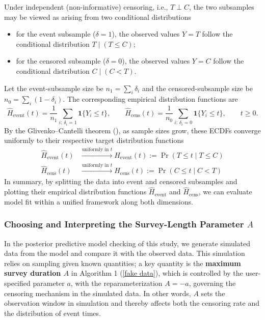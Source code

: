 Under independent (non-informative) censoring, i.e., $T\perp C$, the two subsamples may be viewed as arising from two conditional distributions
\begin{itemize}
    \item for the event subsample ($\delta=1$), the observed values $Y=T$ follow the conditional distribution $T\mid(T\le C)$;
    \item for the censored subsample ($\delta=0$), the observed values $Y=C$ follow the conditional distribution $C\mid(C<T)$.
\end{itemize}
Let the event-subsample size be $n_1=\sum_i \delta_i$ and the censored-subsample size be $n_0=\sum_i (1-\delta_i)$. The corresponding empirical distribution functions are
\begin{equation}
    \widehat H_{\text{event}}(t)
=\frac{1}{n_1}\sum_{i:\,\delta_i=1}\mathbf 1\{Y_i\le t\},\qquad
\widehat H_{\text{cens}}(t)
=\frac{1}{n_0}\sum_{i:\,\delta_i=0}\mathbf 1\{Y_i\le t\},\qquad t\ge 0.
\end{equation}
By the Glivenko–Cantelli theorem (\cite{tucker1959generalization}), as sample sizes grow, these ECDFs converge uniformly to their respective target distribution functions
\begin{align}
\widehat H_{\text{event}}(t) &\xrightarrow{\text{uniformly in } t} H_{\text{event}}(t) := \Pr(T \le t \mid T \le C) \\
\widehat H_{\text{cens}}(t) &\xrightarrow{\text{uniformly in } t} H_{\text{cens}}(t) := \Pr(C \le t \mid C < T)
\end{align}
In summary, by splitting the data into event and censored subsamples and plotting their empirical distribution functions $\widehat H_{\text{event}}$ and $\widehat H_{\text{cens}}$, we can evaluate model fit within a unified framework along both dimensions.



\subsubsection{Choosing and Interpreting the Survey-Length Parameter $A$}

In the posterior predictive model checking of this study, we generate simulated data from the model and compare it with the observed data. This simulation relies on sampling given known quantities; a key quantity is the \textbf{maximum survey duration $A$ }in Algorithm 1 (\ref{fake data}), which is controlled by the user-specified parameter $a$, with the reparameterization $A = -a$, governing the censoring mechanism in the simulated data. In other words, $A$ sets the observation window in simulation and thereby affects both the censoring rate and the distribution of event times.

